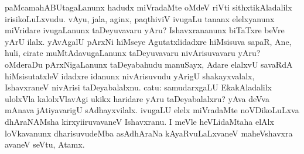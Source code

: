 
\begin{artha}
paMcamahABUtagaLanunx hadudx miVradaMte oMdeV riVti sithxtikAladalilx irisikoLuLxvudu. vAyu, jala, aginx, paqthiviV ivugaLu tananx elelxyanunx miVridare ivugaLanunx taDeyuvavaru yAru? Ishavxrananunx biTaTxre beVre yArU ilalx. yAvAgalU pArxNi hiMseye Agutatxlidadxre hiMsisuva sapaR, Ane, huli, cirate muMtAdavugaLanunx taDeyuvavaru nivArisuvavaru yAru? oMderaDu pArxNigaLanunx taDeyabahudu manuSayx, Adare elalxvU savaRdA hiMsisutatxleV idadxre idanunx nivArisuvudu yArigU shakayxvalalx, IshavxraneV nivArisi taDeyabalalxnu. catu: samudarxgaLU EkakAladalilx ulolxVla kalolxVlavAgi ukikx haridare yAru taDeyabalalxru? yAva deVva mAnava jAtiyavarigU sAdhayxvilalx. ivugaLU elelx miVradaMte noVDikoLuLxva dhAraNAMsha kirxyiiruvavaneV Ishavxranu. I meVle heVLidaMtaha elAlx loVkavanunx dharisuvudeMba asAdhAraNa kAyaRvuLaLxvaneV maheVshavxra avaneV seVtu, Atamx.
\end{artha}


